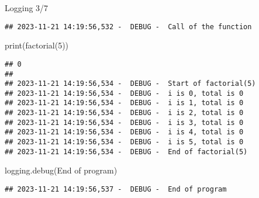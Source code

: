 \documentclass[
  8pt,
  ignorenonframetext,
]{beamer}
\newenvironment{Shaded}{\begin{snugshade}}{\end{snugshade}}
\newcommand{\BuiltInTok}[1]{#1}
\newcommand{\DecValTok}[1]{\textcolor[rgb]{0.00,0.00,0.81}{#1}}
\newcommand{\NormalTok}[1]{#1}
\newcommand{\StringTok}[1]{\textcolor[rgb]{0.31,0.60,0.02}{#1}}
\begin{document}
\begin{frame}[fragile]{Logging 3/7}
\begin{verbatim}
## 2023-11-21 14:19:56,532 -  DEBUG -  Call of the function
\end{verbatim}

\begin{Shaded}
\begin{Highlighting}[]
\BuiltInTok{print}\NormalTok{(factorial(}\DecValTok{5}\NormalTok{))}
\end{Highlighting}
\end{Shaded}

\begin{verbatim}
## 0
## 
## 2023-11-21 14:19:56,534 -  DEBUG -  Start of factorial(5)
## 2023-11-21 14:19:56,534 -  DEBUG -  i is 0, total is 0
## 2023-11-21 14:19:56,534 -  DEBUG -  i is 1, total is 0
## 2023-11-21 14:19:56,534 -  DEBUG -  i is 2, total is 0
## 2023-11-21 14:19:56,534 -  DEBUG -  i is 3, total is 0
## 2023-11-21 14:19:56,534 -  DEBUG -  i is 4, total is 0
## 2023-11-21 14:19:56,534 -  DEBUG -  i is 5, total is 0
## 2023-11-21 14:19:56,534 -  DEBUG -  End of factorial(5)
\end{verbatim}

\begin{Shaded}
\begin{Highlighting}[]
\NormalTok{logging.debug(}\StringTok{\textquotesingle{}End of program\textquotesingle{}}\NormalTok{)}
\end{Highlighting}
\end{Shaded}

\begin{verbatim}
## 2023-11-21 14:19:56,537 -  DEBUG -  End of program
\end{verbatim}
\end{frame}
\end{document}
